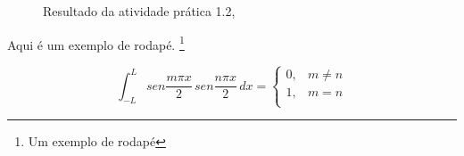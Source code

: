 \begin{figure}[H] %
  \center
  \caption{Resultado da atividade prática 1.2, \cite{oliveira_SO2009}}\label{fig:ap1_cod_vigual1}
\end{figure}







Aqui é um exemplo de rodapé. \footnote{Um exemplo de rodapé}

\begin{equation}
\int_{-L}^{L} sen \frac{m \pi x}{2}\,sen \frac{n \pi x}{2}\,dx =
\left \{
\begin{array}{cc}
0, & m \neq n \\
1, & m = n \\
\end{array}
\right.
\end{equation}




